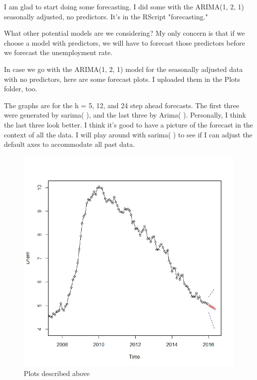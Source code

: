 \documentclass[twoside,twocolumn]{article}
\begin{document}
      I am glad to start doing some forecasting. I did some with the ARIMA(1, 2, 1) seasonally adjusted, no predictors. It's in the RScript "forecasting."

What other potential models are we considering? My only concern is that if we choose a model with predictors, we will have to forecast those predictors before we forecast the unemployment rate.

In case we go with the ARIMA(1, 2, 1) model for the seasonally adjusted data with no predictors, here are some forecast plots. I uploaded them in the Plots folder, too.

The graphs are for the h = 5, 12, and 24 step ahead forecasts. The first three were generated by sarima( ), and the last three by Arima( ). Personally, I think the last three look better. I think it's good to have a picture of the forecast in the context of all the data. I will play around with sarima( ) to see if I can adjust the default axes to accommodate all past data.


 \begin{figure}[H]
    	\centering
     	\caption{Plots described above}
     	\includegraphics[width=.9\linewidth]{images/fore1}
 \end{figure}
 
\end{document}
